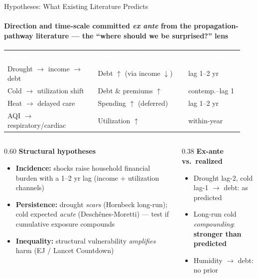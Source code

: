 \documentclass[aspectratio=169,11pt]{beamer}
\newcommand{\emphcolor}[1]{{\color{WarmOrange}\textbf{#1}}}
\newcommand{\tealtext}[1]{{\color{Teal}#1}}
\newcommand{\graytext}[1]{{\color{WarmGray}#1}}
\begin{document}
\begin{frame}{Hypotheses: What Existing Literature Predicts}
  \framesubtitle{Direction and time-scale committed \emph{ex ante} from the propagation-pathway literature --- the ``where should we be surprised?'' lens}
  \scriptsize
  \renewcommand{\arraystretch}{1.15}
  \begin{tabular}{@{}>{\raggedright\arraybackslash}p{0.36\linewidth}>{\raggedright\arraybackslash}p{0.36\linewidth}>{\raggedright\arraybackslash}p{0.22\linewidth}@{}}
    \rowcolor{DeepNavy}
    \textcolor{white}{\textbf{Pathway}} &
    \textcolor{white}{\textbf{Predicted effect}} &
    \textcolor{white}{\textbf{Time-scale}} \\
    \rowcolor{Teal!10}
    Drought \(\to\) income \(\to\) debt & Debt \emphcolor{\(\uparrow\)} (via income \(\downarrow\)) & lag 1--2 yr \\
    Cold \(\to\) utilization shift & Debt \& premiums \emphcolor{\(\uparrow\)} & contemp.--lag 1 \\
    \rowcolor{Teal!10}
    Heat \(\to\) delayed care & Spending \emphcolor{\(\uparrow\)} (deferred) & lag 1--2 yr \\
    AQI \(\to\) respiratory/cardiac & Utilization \emphcolor{\(\uparrow\)} & within-year \\
    \bottomrule
  \end{tabular}
  \vspace{0.45em}
  \begin{columns}[T]
    \begin{column}{0.60\textwidth}
      \footnotesize \textbf{\tealtext{Structural hypotheses}}
      \begin{itemize}\itemsep0.06em
        \item[\textbf{H1}] \textbf{Incidence:} shocks raise household financial burden with a 1--2 yr lag (income + utilization channels)
        \item[\textbf{H2}] \textbf{Persistence:} drought \emph{scars} (Hornbeck long-run); cold expected \emph{acute} (Desch\^enes-Moretti) --- test if cumulative exposure compounds
        \item[\textbf{H3}] \textbf{Inequality:} structural vulnerability \emph{amplifies} harm (EJ / Lancet Countdown)
      \end{itemize}
    \end{column}
    \begin{column}{0.38\textwidth}
      \footnotesize \textbf{\tealtext{Ex-ante vs.\ realized}}
      \begin{itemize}\itemsep0.06em
        \item Drought lag-2, cold lag-1 \(\to\) debt: \tealtext{as predicted}
        \item Long-run cold \emph{compounding}: \emphcolor{stronger than predicted}
        \item Humidity \(\to\) debt: \graytext{no prior}
      \end{itemize}
    \end{column}
  \end{columns}
\end{frame}
\end{document}

